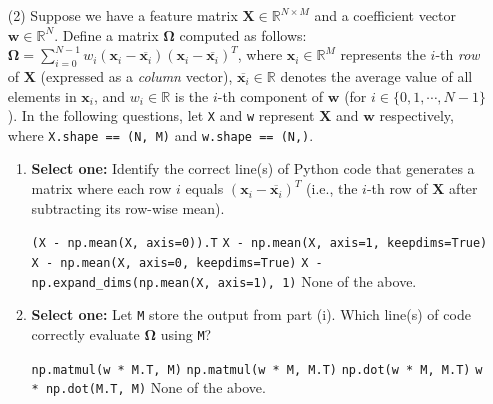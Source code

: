 \documentclass[11pt,addpoints,answers]{exam}
\newcommand{\xv}{\mathbf{x}}
\newcommand{\wv}{\mathbf{w}}
\newcommand{\Xv}{\mathbf{X}}
\newcommand{\Omegav}{\boldsymbol{\Omega}}
\newcommand{\sone}{\textbf{Select one: }}
\begin{document}
\begin{enumerate}[label=\alph*), itemsep=10pt]
		\item[(2)] Suppose we have a feature matrix $\Xv \in \mathbb{R}^{N \times M}$ and a coefficient vector $\wv \in \mathbb{R}^N$. Define a matrix $\Omegav$ computed as follows: $\Omegav = \sum_{i=0}^{N-1} w_i \left(\xv_i - \overline{\xv_i}\right) \left(\xv_i - \overline{\xv_i}\right)^T$, where $\xv_i \in \mathbb{R}^{M}$ represents the $i$-th \textit{row} of $\Xv$ (expressed as a \textit{column} vector), $\overline{\xv_i} \in \mathbb{R}$ denotes the average value of all elements in $\xv_i$, and $w_i \in \mathbb{R}$ is the $i$-th component of $\wv$ (for $i \in \{0, 1, \cdots, N-1\}$). In the following questions, let \texttt{X} and \texttt{w} represent $\Xv$ and $\wv$ respectively, where \texttt{X.shape == (N, M)} and \texttt{w.shape == (N,)}. %
		\begin{enumerate}[label=(\roman*), leftmargin=*]
			
			\item \sone Identify the correct line(s) of Python code that generates a matrix where each row $i$ equals $\left(\xv_i - \overline{\xv_i}\right)^T$ (i.e., the $i$-th row of $\Xv$ after subtracting its row-wise mean).
			
			{%
				\checkboxchar{$\Box$} \checkedchar{$\blacksquare$}
				\begin{checkboxes}
					\choice \texttt{(X - np.mean(X, axis=0)).T}
					\CorrectChoice \texttt{X - np.mean(X, axis=1, keepdims=True)}
					\choice \texttt{X - np.mean(X, axis=0, keepdims=True)}
					\choice \texttt{X - np.expand\_dims(np.mean(X, axis=1), 1)}
					\choice None of the above.
				\end{checkboxes}
			}
			
			
			\item \sone Let \texttt{M} store the output from part (i). Which line(s) of code correctly evaluate $\Omegav$ using \texttt{M}? \\
			
			{
				\checkboxchar{$\Box$} \checkedchar{$\blacksquare$}
				\begin{samepage}
					\begin{checkboxes}
						\CorrectChoice \texttt{np.matmul(w * M.T, M)}
						\choice \texttt{np.matmul(w * M, M.T)}
						\choice \texttt{np.dot(w * M, M.T)}
						\choice \texttt{w * np.dot(M.T, M)}
						\choice None of the above.
					\end{checkboxes}
				\end{samepage}
			}
			
			
		\end{enumerate}
		
	\end{enumerate}
\end{document}
